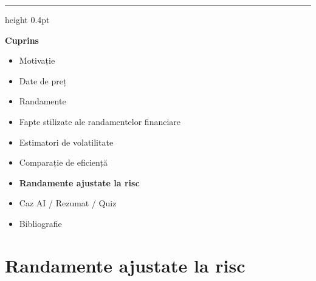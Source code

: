 \documentclass[9pt, aspectratio=169, t]{beamer}
\theoremstyle{definition}
\begin{document}
{
\begin{frame}{}
    {\color{FooterGray}\hrule height 0.4pt}
    \vspace{0.1cm}
    {\Large\textcolor{IDAred}{\textbf{Cuprins}}}
    \vspace{0.2cm}
    \begin{itemize}
        \item Motivație \checkmark
        \item Date de preț \checkmark
        \item Randamente \checkmark
        \item Fapte stilizate ale randamentelor financiare \checkmark
        \item Estimatori de volatilitate \checkmark
        \item Comparație de eficiență \checkmark
        \item \textbf{Randamente ajustate la risc}
        \item Caz AI / Rezumat / Quiz
        \item Bibliografie
    \end{itemize}
\end{frame}
}

\section{Randamente ajustate la risc}
\end{document}
